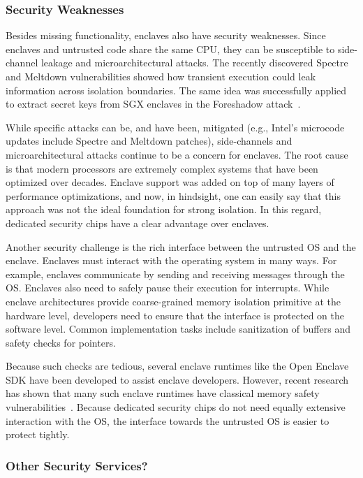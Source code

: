 
\subsubsection*{Security Weaknesses}

Besides missing functionality, enclaves also have security weaknesses. Since enclaves and untrusted code share the same CPU, they can be susceptible to side-channel leakage and microarchitectural attacks. The recently discovered Spectre and Meltdown vulnerabilities showed how transient execution could leak information across isolation boundaries. The same idea was successfully applied to extract secret keys from SGX enclaves in the Foreshadow attack~\cite{van2018foreshadow}. 

While specific attacks can be, and have been, mitigated (e.g., Intel's microcode updates include Spectre and Meltdown patches), side-channels and microarchitectural attacks continue to be a concern for enclaves. The root cause is that modern processors are extremely complex systems that have been optimized over decades. Enclave support was added on top of many layers of performance optimizations, and now, in hindsight, one can easily say that this approach was not the ideal foundation for strong isolation. In this regard, dedicated security chips have a clear advantage over enclaves.

Another security challenge is the rich interface between the untrusted OS and the enclave. Enclaves must interact with the operating system in many ways. For example, enclaves communicate by sending and receiving messages through the OS. Enclaves also need to safely pause their execution for interrupts. While enclave architectures provide coarse-grained memory isolation primitive at the hardware level, developers need to ensure that the interface is protected on the software level. Common implementation tasks include sanitization of buffers and safety checks for pointers. 

Because such checks are tedious, several enclave runtimes like the Open Enclave SDK have been developed to assist enclave developers. However, recent research has shown that many such enclave runtimes have classical memory safety vulnerabilities~\cite{van2019tale}. Because dedicated security chips do not need equally extensive interaction with the OS, the interface towards the untrusted OS is easier to protect tightly. 


\subsubsection*{Other Security Services?}

